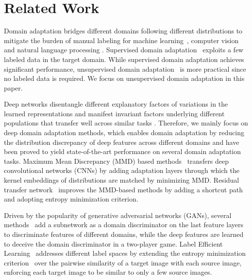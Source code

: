 \documentclass[runningheads]{llncs}
\begin{document}
\section{Related Work}

Domain adaptation \cite{cite:TKDE10TLSurvey} bridges different domains following different distributions to mitigate the burden of manual labeling for machine learning~\cite{cite:TNN11TCA,cite:TPAMI12DTMKL,cite:ICML13TCS,cite:NIPS14FTL}, computer vision \cite{cite:ECCV10Office,cite:CVPR12GFK,cite:NIPS14LSDA} and natural language processing \cite{cite:JMLR11MTLNLP}. Supervised domain adaptation~\cite{cite:ICCV15SDT,cite:CVPR17DAMA,cite:ICCV17SDA,cite:NIPS17FADA} exploits a few labeled data in the target domain. While supervised domain adaptation achieves significant performance, unsupervised domain adaptation~\cite{cite:Arxiv14DDC,cite:ICML15DAN,cite:CVPR17ADDA,cite:ICML15RevGrad,cite:NIPS16RTN,cite:ICML17JAN} is more practical since no labeled data is required. We focus on unsupervised domain adaptation in this paper. 

Deep networks disentangle different explanatory factors of variations in the learned representations \cite{cite:TPAMI13DLSurvey} and manifest invariant factors underlying different populations that transfer well across similar tasks \cite{cite:NIPS14CNN}. Therefore, we mainly focus on deep domain adaptation methods, which enables domain adaptation by reducing the distribution discrepancy of deep features across different domains and have been proved to yield state-of-the-art performance on several domain adaptation tasks. Maximum Mean Discrepancy (MMD) based methods~\cite{cite:Arxiv14DDC,cite:ICML15DAN,cite:ICML17JAN} transfers deep convolutional networks (CNNs) by adding adaptation layers through which the kernel embeddings of distributions are matched by minimizing MMD. Residual transfer network~\cite{cite:NIPS16RTN} improves the MMD-based methods by adding a shortcut path and adopting entropy minimization criterion.

Driven by the popularity of generative adversarial networks (GANs), several methods~\cite{cite:ICML15RevGrad,cite:CVPR17ADDA} add a subnetwork as a domain discriminator on the last feature layers to discriminate features of different domains, while the deep features are learned to deceive the domain discriminator in a two-player game. Label Efficient Learning~\cite{cite:NIPS17LEL} addresses different label spaces by extending the entropy minimization criterion~\cite{cite:NIPS16RTN} over the pairwise similarity of a target image with each source image, enforcing each target image to be similar to only a few source images.  
\end{document}
